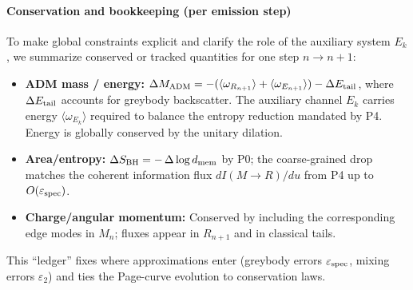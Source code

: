 \documentclass[a4paper,11pt]{article}
\theoremstyle{plain}
\theoremstyle{definition}
\theoremstyle{remark}
\begin{document}
\paragraph{Conservation and bookkeeping (per emission step)}
To make global constraints explicit and clarify the role of the auxiliary system $E_k$, we summarize conserved or tracked quantities for one step $n\!\to\!n{+}1$:
\begin{itemize}[leftmargin=*]
  \item \textbf{ADM mass / energy:} $\Delta M_{\rm ADM} = -(\langle \omega_{R_{n+1}}\rangle + \langle \omega_{E_{n+1}}\rangle) - \Delta E_{\rm tail}$, where $\Delta E_{\rm tail}$ accounts for greybody backscatter. The auxiliary channel $E_k$ carries energy $\langle \omega_{E_{k}}\rangle$ required to balance the entropy reduction mandated by P4. Energy is globally conserved by the unitary dilation.
  \item \textbf{Area/entropy:} $\Delta S_{\rm BH} = -\,\Delta \log d_{\rm mem}$ by P0; the coarse-grained drop matches the coherent information flux $dI(M\!\to\!R)/du$ from P4 up to $O(\varepsilon_{\rm spec})$.
  \item \textbf{Charge/angular momentum:} Conserved by including the corresponding edge modes in $M_n$; fluxes appear in $R_{n+1}$ and in classical tails.
\end{itemize}
This ``ledger'' fixes where approximations enter (greybody errors $\varepsilon_{\rm spec}$, mixing errors $\varepsilon_2$) and ties the Page-curve evolution to conservation laws.
\end{document}
